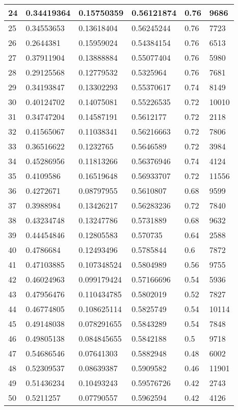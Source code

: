\begin{longtable}{|l|l|l|l|l|l|}
24 & 0.34419364 & 0.15750359 & 0.56121874 & 0.76 & 9686 \\ \hline 
25 & 0.34553653 & 0.13618404 & 0.56245244 & 0.76 & 7723 \\ \hline 
26 & 0.2644381 & 0.15959024 & 0.54384154 & 0.76 & 6513 \\ \hline 
27 & 0.37911904 & 0.13888884 & 0.55077404 & 0.76 & 5980 \\ \hline 
28 & 0.29125568 & 0.12779532 & 0.5325964 & 0.76 & 7681 \\ \hline 
29 & 0.34193847 & 0.13302293 & 0.55370617 & 0.74 & 8149 \\ \hline 
30 & 0.40124702 & 0.14075081 & 0.55226535 & 0.72 & 10010 \\ \hline 
31 & 0.34747204 & 0.14587191 & 0.5612177 & 0.72 & 2118 \\ \hline 
32 & 0.41565067 & 0.11038341 & 0.56216663 & 0.72 & 7806 \\ \hline 
33 & 0.36516622 & 0.1232765 & 0.5646589 & 0.72 & 3984 \\ \hline 
34 & 0.45286956 & 0.11813266 & 0.56376946 & 0.74 & 4124 \\ \hline 
35 & 0.4109586 & 0.16519648 & 0.56933707 & 0.72 & 11556 \\ \hline 
36 & 0.4272671 & 0.08797955 & 0.5610807 & 0.68 & 9599 \\ \hline 
37 & 0.3988984 & 0.13426217 & 0.56283236 & 0.72 & 7840 \\ \hline 
38 & 0.43234748 & 0.13247786 & 0.5731889 & 0.68 & 9632 \\ \hline 
39 & 0.44454846 & 0.12805583 & 0.570735 & 0.64 & 2588 \\ \hline 
40 & 0.4786684 & 0.12493496 & 0.5785844 & 0.6 & 7872 \\ \hline 
41 & 0.47103885 & 0.107348524 & 0.5804989 & 0.56 & 9755 \\ \hline 
42 & 0.46024963 & 0.099179424 & 0.57166696 & 0.54 & 5936 \\ \hline 
43 & 0.47956476 & 0.110434785 & 0.5802019 & 0.52 & 7827 \\ \hline 
44 & 0.46774805 & 0.108625114 & 0.5825749 & 0.54 & 10114 \\ \hline 
45 & 0.49148038 & 0.078291655 & 0.5843289 & 0.54 & 7848 \\ \hline 
46 & 0.49805138 & 0.084845655 & 0.5842188 & 0.5 & 9718 \\ \hline 
47 & 0.54686546 & 0.07641303 & 0.5882948 & 0.48 & 6002 \\ \hline 
48 & 0.52309537 & 0.08639387 & 0.5909582 & 0.46 & 11901 \\ \hline 
49 & 0.51436234 & 0.10493243 & 0.59576726 & 0.42 & 2743 \\ \hline 
50 & 0.5211257 & 0.07790557 & 0.5962594 & 0.42 & 4126 \\ \hline 
\end{longtable}